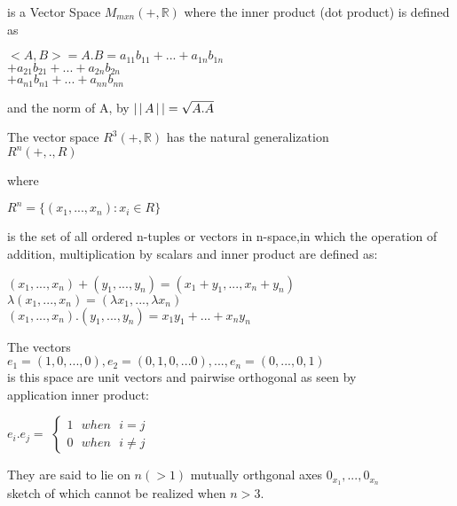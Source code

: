 \documentclass[11pt]{amsbook}
\begin{document}
	is a Vector Space $ M_{mxn} ( + , \mathbb{R} )$ where the inner product (dot product) is defined as \\
	\begin{center}
		$<A,B> = A.B = a_{11}b_{11} + ... + a_{1n}b_{1n} $ \\
		\quad \quad \quad \quad \quad \quad \text{  } $+ a_{21}b_{21} + ... + a_{2n}b_{2n}$ \\
		\quad \quad \quad \quad \quad \quad \quad$+a_{n1}b_{n1} + ... + a_{nn}b_{nn}$ \\
	\end{center}

	and the norm of A, by $ \left \lvert \, \left \lvert \, A \, \right \rvert \, \right \rvert = \sqrt{A.A}  $
	\begin{center}		
		The vector space $ R^3(+, \mathbb{R})$ has the natural generalization \\
		$R^{n}(+, . , R)$ \\
	\end{center}
	where
	\begin{center}
		$ R^n = \{ (x_{1}, ... , x_{n}): x_{i} \in R \} $ \\
	\end{center}
	is the set of all ordered n-tuples or vectors in n-space,in which 
	the operation of addition, multiplication by scalars and inner
	product are defined as: 
	\begin{center}
		$(x_{1}, ... , x_{n}) + (y_{1}, ... , y_{n}) = (x_{1}+y_{1}, ... , x_{n}+y_{n}) $ \\
		\quad \text{ } $ \lambda(x_{1}, ... , x_{n}) = (\lambda x_{1}, ... , \lambda x_{n})$ \\
		$(x_{1}, ... , x_{n}). (y_{1}, ... , y_{n}) = x_{1}y_{1} + ... + x_{n}y_{n} $ \\
	\end{center}
	\quad The vectors \\
	\quad $ e_{1} = ( 1, 0, ... , 0) ,  e_{2} = (0, 1, 0, ... 0), ... ,  e_{n}=(0, ... , 0,1) $ \\
	is this space are unit vectors and pairwise orthogonal as seen by \\
	application inner product:
	\begin{center}
		$ e_{i}.e_{j}  = $
		$\begin{cases}
			1 \text{ } when \text{ } i=j \\
			0\text{ } when \text{ } i \neq j 
		\end {cases} $

	\end{center}
	They are said to lie on $n (>1)$ mutually orthgonal axes $0_{x_{1}}, ... , 0_{x_{n}}$ \\
	sketch of which cannot be realized when $n>3.$
\end{document}
